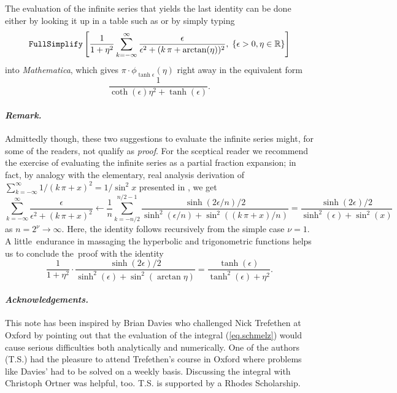 \documentclass[10pt]{amsart}
\newcommand{\R}{{\mathbb  R}}
\begin{document}
The evaluation of the infinite series that yields the last identity can be done either by looking it up in a table such as \cite[(5.1.25.3)]{Tab}
or by simply typing
\[
{\bf\tt FullSimplify}\left[ \frac{1}{1+\eta^2} \sum_{k=-\infty}^\infty \frac{\epsilon}{\epsilon^2+(k\,\pi +\arctan (\eta))^2},
\;\{\epsilon>0,\eta\in\R\}\right]
\]
into \emph{Mathematica}, which gives $\pi\cdot\phi_{\tanh\epsilon}(\eta)$ right away in the equivalent form
\[
\frac{1}{ \coth(\epsilon)\eta^2 + \tanh(\epsilon)}.
\]

\medskip

{\footnotesize
\paragraph{\emph{Remark.}} Admittedly though, these two suggestions to evaluate the infinite series might, for some of the readers,
not qualify as \emph{proof}.
For the sceptical reader we recommend the exercise of
evaluating the infinite series as a partial fraction expansion; in fact, by analogy with the elementary, real analysis derivation
of $\sum_{k=-\infty}^\infty 1/(k\,\pi+x)^2=1/\sin^2 x$ presented in \cite[p.~198]{Hof}, we get
\[
\sum_{k=-\infty}^\infty \frac{\epsilon}{\epsilon^2+(k\,\pi+x)^2} \leftarrow \frac{1}{n} \sum_{k=-n/2}^{n/2-1}
\frac{\sinh(2\epsilon/n)/2}{\sinh^2(\epsilon/n)+\sin^2((k\,\pi+x)/n)} =
\frac{\sinh(2\epsilon)/2}{\sinh^2(\epsilon)+\sin^2(x)}
\]
as $n=2^\nu \to \infty$. Here, the identity follows recursively from the simple case $\nu=1$. A little~endurance in massaging the
hyperbolic and trigonometric functions helps us to conclude the~proof with the identity
\[
\frac{1}{1+\eta^2} \cdot\frac{\sinh(2\epsilon)/2}{\sinh^2(\epsilon)+\sin^2(\arctan \eta)} = \frac{\tanh(\epsilon)}{\tanh^2(\epsilon) + \eta^2}.
\]
}

\smallskip

{\footnotesize
\paragraph{\emph{Acknowledgements.}} This note has been inspired by Brian Davies who challenged Nick Trefethen at Oxford by
pointing out that the evaluation of the integral (\ref{eq.schmelz}) would cause serious
difficulties both analytically and numerically. One of the authors (T.S.)
had the pleasure to attend Trefethen's course in Oxford where problems like
Davies' had to be solved on a weekly basis. Discussing the integral with
Christoph Ortner was helpful, too. T.S. is supported by a Rhodes Scholarship.

}
\end{document}
